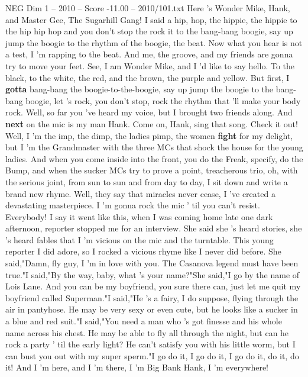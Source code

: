 \begin{textsample}{NEG Dim 1 – 2010 – Score -11.00 – 2010/101.txt}  \label{ex:f1_neg_023}
Here 's Wonder Mike, Hank, and Master Gee, The Sugarhill Gang!
I said a hip, hop, the hippie, the hippie to the hip hip hop and you don't stop the rock it to the bang-bang boogie, say up jump the boogie to the rhythm of the boogie, the beat.
Now what you hear is not a test, I 'm rapping to the beat.
And me, the groove, and my friends are gonna try to move your feet.
See, I am Wonder Mike, and I 'd like to say hello.
To the black, to the white, the red, and the brown, the purple and yellow.
But first, I \textbf{gotta} bang-bang the boogie-to-the-boogie, say up jump the boogie to the bang-bang boogie, let 's rock, you don't stop, rock the rhythm that 'll make your body rock.
Well, so far you 've heard my voice, but I brought two friends along.
And \textbf{next} on the mic is my man Hank.
Come on, Hank, sing that song.
Check it out!
Well, I 'm the imp, the dimp, the ladies pimp, the women \textbf{fight} for my delight, but I 'm the Grandmaster with the three MCs that shock the house for the young ladies.
And when you come inside into the front, you do the Freak, specify, do the Bump, and when the sucker MCs try to prove a point, treacherous trio, oh, with the serious joint, from sun to sun and from day to day, I sit down and write a brand new rhyme.
Well, they say that miracles never cease, I 've created a devastating masterpiece.
I 'm gonna rock the mic ' til you can't resist.
Everybody!
I say it went like this, when I was coming home late one dark afternoon, reporter stopped me for an interview.
She said she 's heard stories, she 's heard fables that I 'm vicious on the mic and the turntable.
This young reporter I did adore, so I rocked a vicious rhyme like I never did before.
She said,"Damn, fly guy, I 'm in love with you.
The Casanova legend must have been true."I said,"By the way, baby, what 's your name?"She said,"I go by the name of Lois Lane.
And you can be my boyfriend, you sure there can, just let me quit my boyfriend called Superman."I said,"He 's a fairy, I do suppose, flying through the air in pantyhose.
He may be very sexy or even cute, but he looks like a sucker in a blue and red suit."I said,"You need a man who 's got finesse and his whole name across his chest.
He may be able to fly all through the night, but can he rock a party ' til the early light?
He can't satisfy you with his little worm, but I can bust you out with my super sperm."I go do it, I go do it, I go do it, do it, do it!
And I 'm here, and I 'm there, I 'm Big Bank Hank, I 'm everywhere!

\end{textsample}

